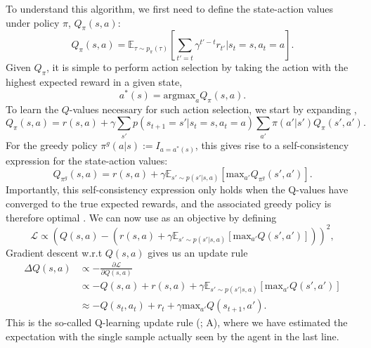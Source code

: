 To understand this algorithm, we first need to define the state-action values under policy $\pi$, $Q_\pi(s, a)$:
\begin{equation}
    \label{eq:Q-values}
    Q_\pi(s,a) =  \mathbb{E}_{\tau \sim p_\pi(\tau)} \left [ \sum_{t'=t} \gamma^{t' - t} r_{t'} | s_{t} = s, a_{t} = a \right ].
\end{equation}
Given $Q_\pi$, it is simple to perform action selection by taking the action with the highest expected reward in a given state,
\begin{equation}
    a^*(s) = \text{argmax}_{a} Q_\pi(s, a).
\end{equation}
To learn the $Q$-values necessary for such action selection, we start by expanding ,
\begin{equation}
    \label{eq:Q-expanded}
    Q_\pi(s,a) = r(s, a) + \gamma \sum_{s'} p(s_{t+1} = s'| s_t=s, a_t=a) \sum_{a'} \pi(a' | s') Q_\pi(s', a').
\end{equation}
For the greedy policy $\pi^g(a|s) := I_{a = a^*(s)}$, this gives rise to a self-consistency expression for the state-action values:
\begin{equation}
    \label{eq:Q-optimal}
    Q_{\pi^g}(s,a) = r(s, a) + \gamma \mathbb{E}_{s' \sim p(s' | s, a)} \left [ \text{max}_{a'} Q_{\pi^g}(s', a') \right ].
\end{equation}
Importantly, this self-consistency expression only holds when the Q-values have converged to the true expected rewards, and the associated greedy policy is therefore optimal \citep{sutton2018reinforcement}.
We can now use  as an objective by defining
\begin{equation}
    \mathcal{L} \propto \left (  Q(s,a) - (r(s, a) + \gamma \mathbb{E}_{s' \sim p(s' | s, a)} \left [ \text{max}_{a'} Q(s', a') \right ] ) \right )^2,
\end{equation}
Gradient descent w.r.t $Q(s,a)$ gives us an update rule
\begin{align}
    \Delta  Q(s,a) & \propto - \frac{\partial \mathcal{L}}{\partial  Q(s,a)}\\
    &\propto - Q(s,a) + r(s, a) + \gamma \mathbb{E}_{s' \sim p(s' | s, a)} \left [ \text{max}_{a'} Q(s',a') \right ] \\
    &\approx - Q(s_t,a_t) + r_t + \gamma \text{max}_{a'} Q(s_{t+1}, a').
\end{align}
This is the so-called Q-learning update rule (\citealp{watkins1989learning}; A), where we have estimated the expectation with the single sample actually seen by the agent in the last line.

